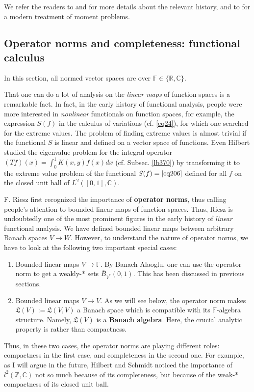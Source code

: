 \documentclass[12pt,b5paper,notitlepage]{article}
\theoremstyle{definition}
\theoremstyle{plain}
\newcommand{\fk}{\mathfrak}
\newcommand{\ovl}{\overline}
\newcommand{\Cbb}{\mathbb C}
\newcommand{\Zbb}{\mathbb Z}
\newcommand{\Rbb}{\mathbb R}
\newcommand{\Fbb}{\mathbb F}
\numberwithin{equation}{section}
\begin{document}
We refer the readers to \cite[Ch. VI]{Die-H} and \cite{NB97} for more details about the relevant history, and to \cite[Sec. 4.17 \& 5.6]{Sim-R} for a modern treatment of moment problems.



\subsection{Operator norms and completeness: functional calculus}


In this section, all normed vector spaces are over $\Fbb\in\{\Rbb,\Cbb\}$.

That one can do a lot of analysis on the \textit{linear maps} of function spaces is a remarkable fact. In fact, in the early history of functional analysis, people were more interested in \textit{nonlinear} functionals on function spaces, for example, the expression $S(f)$ in the calculus of variations (cf. \eqref{eq24}), for which one searched for the extreme values. The problem of finding extreme values is almost trivial if the functional $S$ is linear and defined on a vector space of functions. Even Hilbert studied the eigenvalue problem for the integral operator $(Tf)(x)=\int_0^1 K(x,y)f(x)dx$ (cf. Subsec. \ref{lb370}) by transforming it to the extreme value problem of the functional $S(f)=\eqref{eq206}$ defined for all $f$ on the closed unit ball of $L^2([0,1],\Cbb)$.



F. Riesz first recognized the importance of \textbf{operator norms}, thus calling people's attention to bounded linear maps of function spaces. Thus, Riesz is undoubtedly one of the most prominent figures in the early history of \textit{linear} functional analysis. We have defined bounded linear maps between arbitrary Banach spaces $V\rightarrow W$. However, to understand the nature of operator norms, we have to look at the following two important special cases:
\begin{enumerate}[label=(\arabic*)]
\item Bounded linear maps $V\rightarrow\Fbb$. By Banach-Alaoglu, one can use the operator norm to get a weakly-*  sets $\ovl B_{V^*}(0,1)$. This has been discussed in previous sections.
\item Bounded linear maps $V\rightarrow V$. As we will see below, the operator norm makes $\fk L(V):=\fk L(V,V)$ a Banach space which is compatible with its $\Fbb$-algebra structure. Namely, $\fk L(V)$ is a \textbf{Banach algebra}. Here, the crucial analytic property is  rather than compactness. 
\end{enumerate} 
Thus, in these two cases, the operator norms are playing different roles: compactness in the first case, and completeness in the second one. For example, as I will argue in the future, Hilbert and Schmidt noticed the importance of $l^2(\Zbb,\Cbb)$ not so much because of its completeness, but because of the weak-* compactness of its closed unit ball.
\end{document}
